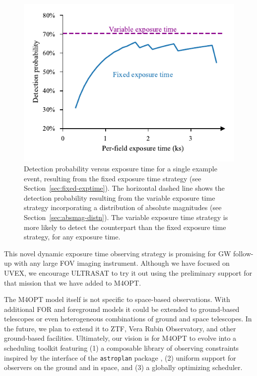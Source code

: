 \documentclass[twocolumn,times]{aastex631}
\begin{document}
\begin{figure}
    \includegraphics[width=\columnwidth]{figures/prob-exptime}
    \caption{\label{fig:prob-exptime}Detection probability versus exposure time for a single example event, resulting from the fixed exposure time strategy (see Section~\ref{sec:fixed-exptime}). The horizontal dashed line shows the detection probability resulting from the variable exposure time strategy incorporating a distribution of absolute magnitudes (see Section~\ref{sec:absmag-distn}). The variable exposure time strategy is more likely to detect the counterpart than the fixed exposure time strategy, for any exposure time.}
\end{figure}

This novel dynamic exposure time observing strategy is promising for \ac{GW} follow-up with any large \ac{FOV} imaging instrument. Although we have focused on \ac{UVEX}, we encourage ULTRASAT to try it out using the preliminary support for that mission that we have added to \ac{M4OPT}.

The \ac{M4OPT} model itself is not specific to space-based observations. With additional \ac{FOR} and foreground models it could be extended to ground-based telescopes or even heterogeneous combinations of ground and space telescopes. In the future, we plan to extend it to \ac{ZTF}, Vera Rubin Observatory, and other ground-based facilities. Ultimately, our vision is for \ac{M4OPT} to evolve into a scheduling toolkit featuring (1) a composable library of observing constraints inspired by the interface of the \texttt{astroplan} package \citep{2018AJ....155..128M}, (2) uniform support for observers on the ground and in space, and (3) a globally optimizing scheduler.
\end{document}
